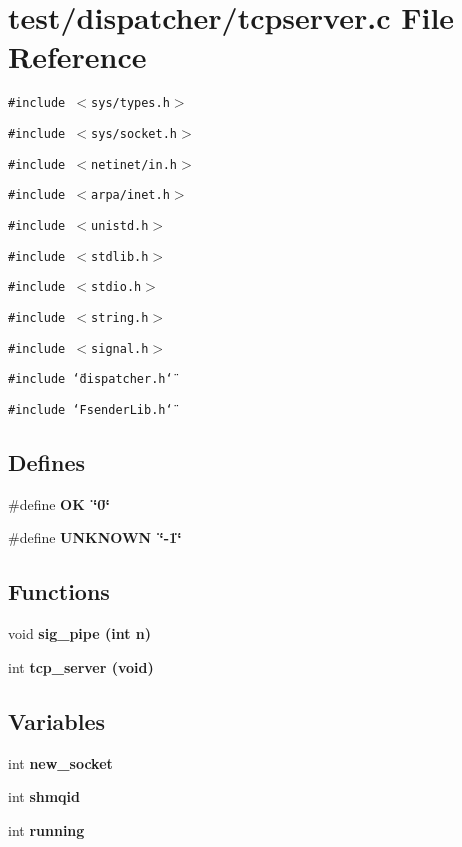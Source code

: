 \section{test/dispatcher/tcpserver.c File Reference}
\label{dispatcher_2tcpserver_8c}
{\tt \#include $<$sys/types.h$>$}\par
{\tt \#include $<$sys/socket.h$>$}\par
{\tt \#include $<$netinet/in.h$>$}\par
{\tt \#include $<$arpa/inet.h$>$}\par
{\tt \#include $<$unistd.h$>$}\par
{\tt \#include $<$stdlib.h$>$}\par
{\tt \#include $<$stdio.h$>$}\par
{\tt \#include $<$string.h$>$}\par
{\tt \#include $<$signal.h$>$}\par
{\tt \#include \char`\"{}dispatcher.h\char`\"{}}\par
{\tt \#include \char`\"{}Fsender\-Lib.h\char`\"{}}\par
\subsection*{Defines}
\begin{CompactItemize}
\item 
\#define \bf{OK}~\char`\"{}0\char`\"{}
\item 
\#define \bf{UNKNOWN}~\char`\"{}-1\char`\"{}
\end{CompactItemize}
\subsection*{Functions}
\begin{CompactItemize}
\item 
void \bf{sig\_\-pipe} (int \bf{n})
\item 
int \bf{tcp\_\-server} (void)
\end{CompactItemize}
\subsection*{Variables}
\begin{CompactItemize}
\item 
int \bf{new\_\-socket}
\item 
int \bf{shmqid}
\item 
int \bf{running}
\end{CompactItemize}


